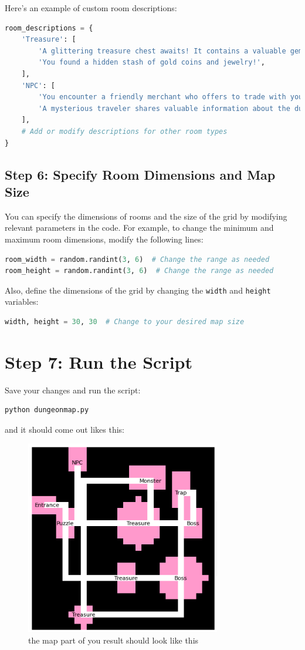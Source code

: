 \documentclass[10pt,twocolumn]{article}
\begin{document}
Here's an example of custom room descriptions:

\begin{lstlisting}[language=Python]
room_descriptions = {
    'Treasure': [
        'A glittering treasure chest awaits! It contains a valuable gem.',
        'You found a hidden stash of gold coins and jewelry!',
    ],
    'NPC': [
        'You encounter a friendly merchant who offers to trade with you.',
        'A mysterious traveler shares valuable information about the dungeon.',
    ],
    # Add or modify descriptions for other room types
}
\end{lstlisting}

\subsection{Step 6: Specify Room Dimensions and Map Size}

You can specify the dimensions of rooms and the size of the grid by modifying relevant parameters in the code. For example, to change the minimum and maximum room dimensions, modify the following lines:

\begin{lstlisting}[language=Python]
room_width = random.randint(3, 6)  # Change the range as needed
room_height = random.randint(3, 6)  # Change the range as needed
\end{lstlisting}

Also, define the dimensions of the grid by changing the \texttt{width} and \texttt{height} variables:

\begin{lstlisting}[language=Python]
width, height = 30, 30  # Change to your desired map size
\end{lstlisting}

\section{Step 7: Run the Script}

Save your changes and run the script:

\begin{lstlisting}[language=bash]
python dungeonmap.py
\end{lstlisting}
and it should come out likes this:
\begin{figure}
    \centering
    \includegraphics[width=0.5\linewidth]{example1.png}
    \caption{the map part of you result should look like this}
    \label{fig:enter-label}
\end{figure}
\end{document}
